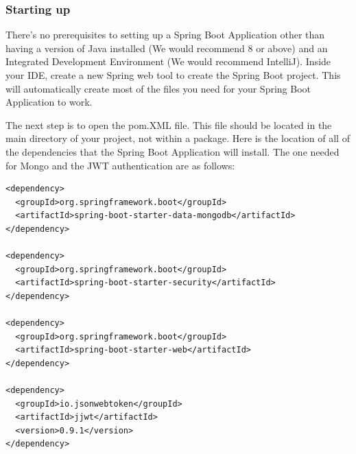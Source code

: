 \subsubsection{Starting up}
There's no prerequisites to setting up a Spring Boot Application other than having a version of Java installed (We would recommend 8 or above) and an Integrated Development Environment (We would recommend IntelliJ). Inside your IDE, create a new Spring web tool to create the Spring Boot project. This will automatically create most of the files you need for your Spring Boot Application to work. \par
The next step is to open the pom.XML file. This file should be located in the main directory of your project, not within a package. Here is the location of all of the dependencies that the Spring Boot Application will install. The one needed for Mongo and the JWT authentication are as follows: \par
\begin{verbatim}
<dependency>
  <groupId>org.springframework.boot</groupId>
  <artifactId>spring-boot-starter-data-mongodb</artifactId>
</dependency>

<dependency>
  <groupId>org.springframework.boot</groupId>
  <artifactId>spring-boot-starter-security</artifactId>
</dependency>

<dependency>
  <groupId>org.springframework.boot</groupId>
  <artifactId>spring-boot-starter-web</artifactId>
</dependency>

<dependency>
  <groupId>io.jsonwebtoken</groupId>
  <artifactId>jjwt</artifactId>
  <version>0.9.1</version>
</dependency>
\end{verbatim}

